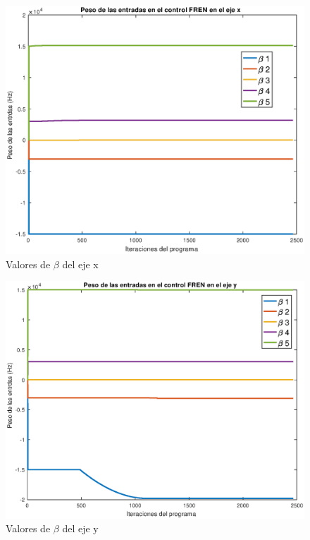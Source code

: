 \begin{figure}
	\centering
	\includegraphics[width=1\linewidth]{visio/graficasderesultados/betasx1}
	\caption{Valores de $\beta$ del eje x}
	\label{fig:betasx1}
\end{figure}
\begin{figure}
	\centering
	\includegraphics[width=1\linewidth]{visio/graficasderesultados/betasy1}
	\caption{Valores de $\beta$ del eje y}
	\label{fig:betasy1}
\end{figure}
